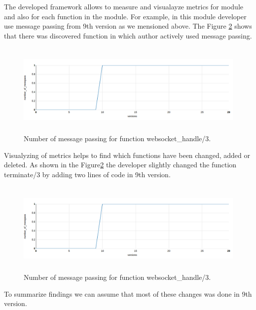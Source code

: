 The developed framework allows to measure and visualayze metrics for module and also for each function in the module. For example, in this module developer use message passing from 9th version as we mensioned above. The Figure \ref{fig:chat3} shows that there was discovered function in which author actively used message passing.

\begin{figure}[h]
	\centering
	\includegraphics[height=45mm]{figures/chat3.png}
	\caption{
	Number of message passing for function websocket\_handle/3.}
	\label{fig:chat3}
\end{figure}

Visualyzing of metrics helps to find which functions have been changed, added or deleted. As shown in the Figure\ref{fig:chat3} the developer slightly changed the function terminate/3 by adding two lines of code in 9th version.
\begin{figure}[h]
	\centering
	\includegraphics[height=45mm]{figures/chat3.png}
	\caption{
		Number of message passing for function websocket\_handle/3.}
	\label{fig:chat3}
\end{figure}
 
To summarize findings we can assume that most of these changes was done in 9th version.